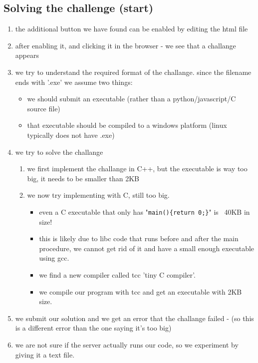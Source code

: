 \documentclass{article}
\begin{document}
\subsection{Solving the challenge (start)}
\begin{enumerate}
	\item the additional button we have found can be enabled by editing the html file
	\item after enabling it, and clicking it in the browser - we see that a challange appears
	\item we try to understand the required format of the challange.
        since the filename ends with '.exe' we assume two things:
        \begin{itemize}
			\item we should submit an executable (rather than a python/javascript/C source file)
			\item that executable should be compiled to a windows platform (linux typically does not have .exe)
        \end{itemize}
	\item we try to solve the challange
    \begin{enumerate}
		\item we first implement the challange in C++, but the executable is way too big, it needs to be smaller than 2KB
		\item we now try implementing with C, still too big.
        \begin{itemize}
			\item even a C executable that only has "\texttt{main()\{return 0;\}}" is ~40KB in size!
			\item this is likely due to libc code that runs before and after the main procedure, we cannot get rid of it
				and have a small enough executable using gcc.
			\item we find a new compiler called tcc 'tiny C compiler'.
			\item we compile our program with tcc and get an executable with 2KB size.
        \end{itemize}
    \end{enumerate}
    \item we submit our solution and we get an error that the challange failed - (so this is a different error than the one saying it's too big)
	\item we are not sure if the server actually runs our code, so we experiment by giving it a text file.
\end{enumerate}
\end{document}
